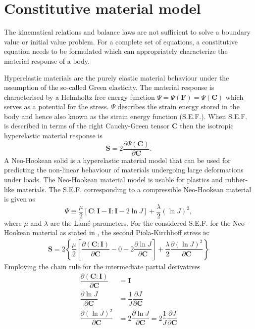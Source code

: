 \section{Constitutive material model}
\label{sec:const_law}
The kinematical relations and balance laws are not sufficient to solve a boundary value or initial value problem. For a complete set of equations, a constitutive equation needs to be formulated which can appropriately characterize the material response of a body. \par 

Hyperelastic materials are the purely elastic material behaviour under the assumption of the so-called Green elasticity. The material response is characterised by a Helmholtz free energy function $\Psi = \Psi(\mathbf{F}) = \Psi(\mathbf{C}) $ which serves as a potential for the stress. $\Psi$ describes the strain energy stored in the body and hence also known as the strain energy function (S.E.F.). When S.E.F. is described in terms of the right Cauchy-Green tensor $\mathbf{C}$ then the isotropic hyperelastic material response is 
\begin{equation}
\mathbf{S} = 2 \dfrac{\partial \Psi (\mathbf{C})}{\partial \mathbf{C}}.
\end{equation}
A Neo-Hookean solid is a hyperelastic material model that can be used for predicting the non-linear behaviour of materials undergoing large deformations under loads. The Neo-Hookean material model is usable for plastics and rubber-like materials. The S.E.F. corresponding to a compressible Neo-Hookean material is given as
\begin{equation}
\Psi \equiv \dfrac{\mu}{2} [\mathbf{C} : \mathbf{I} - \mathbf{I} : \mathbf{I} - 2 \ln J] + \dfrac{\lambda}{2} (\ln J)^2,
\label{eq:2.2}
\end{equation}
where $\mu$ and $\lambda$ are the Lam\'e parameters. For the considered S.E.F. for the Neo-Hookean material as stated in , the second Piola-Kirchhoff stress is:
\begin{align}
\mathbf{S} = 2 \left\{ \dfrac{\mu}{2} \left[\dfrac{\partial (\mathbf{C} : \mathbf{I})}{\partial \mathbf{C}} - 0 - 2 \dfrac{\partial \ln J}{\partial \mathbf{C}}\right] + \dfrac{\lambda}{2} \dfrac{\partial (\ln J)^2}{\partial \mathbf{C}} \right\}
\end{align}
Employing the chain rule for the intermediate partial derivatives
\begin{align}
\dfrac{\partial (\mathbf{C} : \mathbf{I})}{\partial \mathbf{C}} &= \mathbf{I} \label{eq:2.4.1} \\ 
\dfrac{\partial \ln J}{\partial \mathbf{C}} &= \dfrac{1}{J} \dfrac{\partial J}{\partial \mathbf{C}} \label{eq:2.4.2} \\ 
\dfrac{\partial (\ln J)^2}{\partial \mathbf{C}} &= 2 \dfrac{\partial \ln J}{\partial \mathbf{C}} = 2 \dfrac{1}{J} \dfrac{\partial J}{\partial \mathbf{C}}
\label{eq:2.4.3}
\end{align}
